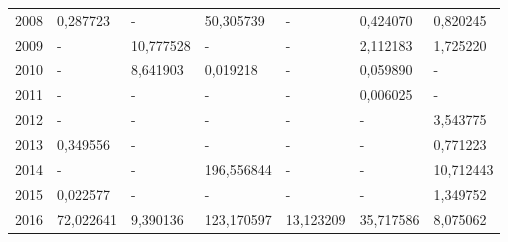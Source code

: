 \begin{table}
\begin{tabular}{p{1cm}p{2cm}p{2cm}p{2cm}p{2cm}p{2cm}p{2cm}}
 2008 &                                     0,287723 &                                           - &        50,305739 &                                           - &                       0,424070 &                        0,820245 \\
 2009 &                                            - &                                   10,777528 &                - &                                           - &                       2,112183 &                        1,725220 \\
 2010 &                                            - &                                    8,641903 &         0,019218 &                                           - &                       0,059890 &                               - \\
 2011 &                                            - &                                           - &                - &                                           - &                       0,006025 &                               - \\
 2012 &                                            - &                                           - &                - &                                           - &                              - &                        3,543775 \\
 2013 &                                     0,349556 &                                           - &                - &                                           - &                              - &                        0,771223 \\
 2014 &                                            - &                                           - &       196,556844 &                                           - &                              - &                       10,712443 \\
 2015 &                                     0,022577 &                                           - &                - &                                           - &                              - &                        1,349752 \\
 2016 &                                    72,022641 &                                    9,390136 &       123,170597 &                                   13,123209 &                      35,717586 &                        8,075062 \\
\bottomrule
\end{tabular}
\end{table}
